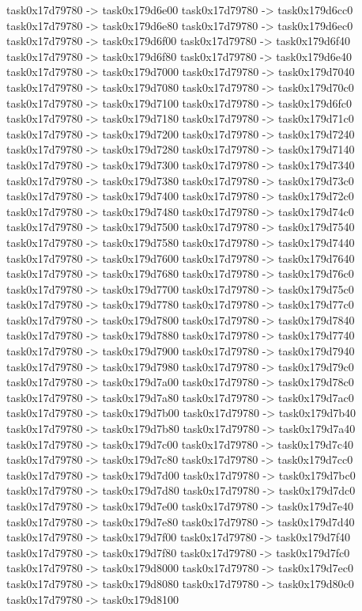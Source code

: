 {	task0x17d79780 -> task0x179d6e00
	task0x17d79780 -> task0x179d6cc0
	task0x17d79780 -> task0x179d6e80
	task0x17d79780 -> task0x179d6ec0
	task0x17d79780 -> task0x179d6f00
	task0x17d79780 -> task0x179d6f40
	task0x17d79780 -> task0x179d6f80
	task0x17d79780 -> task0x179d6e40
	task0x17d79780 -> task0x179d7000
	task0x17d79780 -> task0x179d7040
	task0x17d79780 -> task0x179d7080
	task0x17d79780 -> task0x179d70c0
	task0x17d79780 -> task0x179d7100
	task0x17d79780 -> task0x179d6fc0
	task0x17d79780 -> task0x179d7180
	task0x17d79780 -> task0x179d71c0
	task0x17d79780 -> task0x179d7200
	task0x17d79780 -> task0x179d7240
	task0x17d79780 -> task0x179d7280
	task0x17d79780 -> task0x179d7140
	task0x17d79780 -> task0x179d7300
	task0x17d79780 -> task0x179d7340
	task0x17d79780 -> task0x179d7380
	task0x17d79780 -> task0x179d73c0
	task0x17d79780 -> task0x179d7400
	task0x17d79780 -> task0x179d72c0
	task0x17d79780 -> task0x179d7480
	task0x17d79780 -> task0x179d74c0
	task0x17d79780 -> task0x179d7500
	task0x17d79780 -> task0x179d7540
	task0x17d79780 -> task0x179d7580
	task0x17d79780 -> task0x179d7440
	task0x17d79780 -> task0x179d7600
	task0x17d79780 -> task0x179d7640
	task0x17d79780 -> task0x179d7680
	task0x17d79780 -> task0x179d76c0
	task0x17d79780 -> task0x179d7700
	task0x17d79780 -> task0x179d75c0
	task0x17d79780 -> task0x179d7780
	task0x17d79780 -> task0x179d77c0
	task0x17d79780 -> task0x179d7800
	task0x17d79780 -> task0x179d7840
	task0x17d79780 -> task0x179d7880
	task0x17d79780 -> task0x179d7740
	task0x17d79780 -> task0x179d7900
	task0x17d79780 -> task0x179d7940
	task0x17d79780 -> task0x179d7980
	task0x17d79780 -> task0x179d79c0
	task0x17d79780 -> task0x179d7a00
	task0x17d79780 -> task0x179d78c0
	task0x17d79780 -> task0x179d7a80
	task0x17d79780 -> task0x179d7ac0
	task0x17d79780 -> task0x179d7b00
	task0x17d79780 -> task0x179d7b40
	task0x17d79780 -> task0x179d7b80
	task0x17d79780 -> task0x179d7a40
	task0x17d79780 -> task0x179d7c00
	task0x17d79780 -> task0x179d7c40
	task0x17d79780 -> task0x179d7c80
	task0x17d79780 -> task0x179d7cc0
	task0x17d79780 -> task0x179d7d00
	task0x17d79780 -> task0x179d7bc0
	task0x17d79780 -> task0x179d7d80
	task0x17d79780 -> task0x179d7dc0
	task0x17d79780 -> task0x179d7e00
	task0x17d79780 -> task0x179d7e40
	task0x17d79780 -> task0x179d7e80
	task0x17d79780 -> task0x179d7d40
	task0x17d79780 -> task0x179d7f00
	task0x17d79780 -> task0x179d7f40
	task0x17d79780 -> task0x179d7f80
	task0x17d79780 -> task0x179d7fc0
	task0x17d79780 -> task0x179d8000
	task0x17d79780 -> task0x179d7ec0
	task0x17d79780 -> task0x179d8080
	task0x17d79780 -> task0x179d80c0
	task0x17d79780 -> task0x179d8100
}
